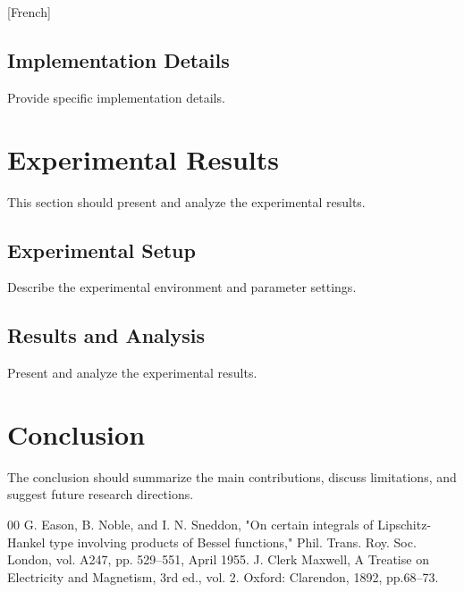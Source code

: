 [French] \documentclass[conference,twocolumn]{IEEEtran}
\begin{document}
\subsection{Implementation Details}
Provide specific implementation details.

\section{Experimental Results}
This section should present and analyze the experimental results.

\subsection{Experimental Setup}
Describe the experimental environment and parameter settings.

\subsection{Results and Analysis}
Present and analyze the experimental results.

\section{Conclusion}
The conclusion should summarize the main contributions, discuss limitations,
and suggest future research directions.

\begin{thebibliography}{00}
 G. Eason, B. Noble, and I. N. Sneddon, "On certain integrals of
Lipschitz-Hankel type involving products of Bessel functions," Phil. Trans. Roy. Soc. London, vol. A247, pp. 529--551, April 1955.
 J. Clerk Maxwell, A Treatise on Electricity and Magnetism, 3rd ed., vol. 2. Oxford: Clarendon, 1892, pp.68--73.
\end{thebibliography}
\end{document}
